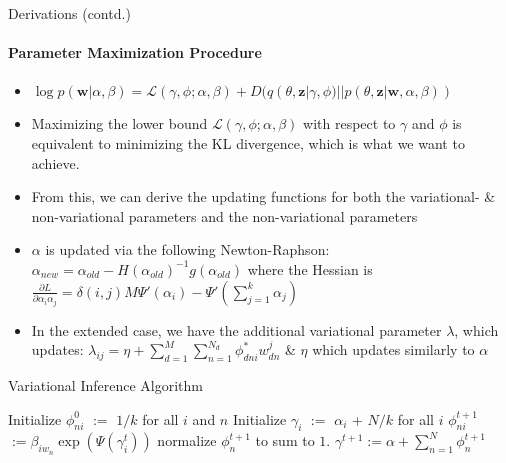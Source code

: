 \documentclass[aspectratio=169]{beamer}
\begin{document}
\begin{frame}{Derivations (contd.)}
  \framesubtitle{Parameter Maximization Procedure}
  \begin{itemize}
    \item $\log p(\textbf{w}| \alpha, \beta) = \mathcal{L} (\gamma, \phi; \alpha, \beta) + D(q(\theta , \textbf{z} | \gamma, \phi) || p(\theta, \textbf{z} | \textbf{w}, \alpha, \beta))$
    \item Maximizing the lower bound $\mathcal{L} (\gamma, \phi; \alpha, \beta)$ with respect to $\gamma$ and $\phi$ is equivalent to minimizing the KL divergence, which is what we want to achieve.
    \item From this, we can derive the updating functions for both the variational- \& non-variational parameters and the non-variational parameters
    \item $\alpha$ is updated via the following Newton-Raphson: $\alpha_{new} = \alpha_{old} - \textit{H}(\alpha_{old})^{-1} g(\alpha_{old})$ where the Hessian is $\frac{\partial L}{\partial \alpha_i \alpha_j} = \delta(i,j)\textit{M}\Psi'(\alpha_i) - \Psi'\left(\sum^k_{j=1}\alpha_j\right) $
    \item In the extended case, we have the additional variational parameter $\lambda$, which updates: $\lambda_{ij} = \eta + \sum^{M}_{d=1}\sum^{N_d}_{n=1}\phi^*_{dni}w^j_{dn}$ \& $\eta$ which updates similarly to $\alpha$
  \end{itemize}
\end{frame}

\begin{frame}{Variational Inference Algorithm}
  \begin{algorithm}[H]
    \begin{algorithmic}[1] 
      \State Initialize $\phi^{0}_{ni}$ $:=$ $1/k$ for all $i$ and $n$ 
      \State Initialize $\gamma_{i}$ $:=$ $\alpha_{i}$ + $N/k$ for all $i$ 
      \Repeat
            \State $\phi^{t+1}_{ni}$ $:=\beta_{iw_{n}} \exp(\Psi(\gamma^t_i))$ 
          \EndFor 
          \State normalize $\phi^{t+1}_{n}$ to sum to $1$.
        \EndFor 
        \State $\gamma^{t+1} := \alpha + \sum^{N}_{n=1} \phi^{t+1}_{n}$
    \caption{Pseudocode for variational inference (for simplified model), adapted from \cite{LDA}}
    \end{algorithmic}
  \end{algorithm}
\end{frame}
\end{document}
